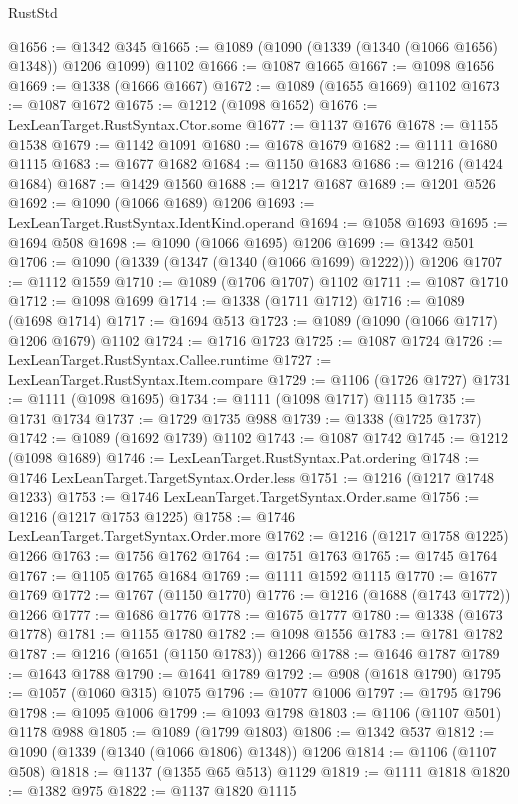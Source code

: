 \begin{lexlean}{RustStd}
\begin{coremodule}
@1656 := @1342 @345
@1665 := @1089 (@1090 (@1339 (@1340 (@1066 @1656) @1348)) @1206 @1099) @1102
@1666 := @1087 @1665
@1667 := @1098 @1656
@1669 := @1338 (@1666 @1667)
@1672 := @1089 (@1655 @1669) @1102
@1673 := @1087 @1672
@1675 := @1212 (@1098 @1652)
@1676 := LexLeanTarget.RustSyntax.Ctor.some
@1677 := @1137 @1676
@1678 := @1155 @1538
@1679 := @1142 @1091
@1680 := @1678 @1679
@1682 := @1111 @1680 @1115
@1683 := @1677 @1682
@1684 := @1150 @1683
@1686 := @1216 (@1424 @1684)
@1687 := @1429 @1560
@1688 := @1217 @1687
@1689 := @1201 @526
@1692 := @1090 (@1066 @1689) @1206
@1693 := LexLeanTarget.RustSyntax.IdentKind.operand
@1694 := @1058 @1693
@1695 := @1694 @508
@1698 := @1090 (@1066 @1695) @1206
@1699 := @1342 @501
@1706 := @1090 (@1339 (@1347 (@1340 (@1066 @1699) @1222))) @1206
@1707 := @1112 @1559
@1710 := @1089 (@1706 @1707) @1102
@1711 := @1087 @1710
@1712 := @1098 @1699
@1714 := @1338 (@1711 @1712)
@1716 := @1089 (@1698 @1714)
@1717 := @1694 @513
@1723 := @1089 (@1090 (@1066 @1717) @1206 @1679) @1102
@1724 := @1716 @1723
@1725 := @1087 @1724
@1726 := LexLeanTarget.RustSyntax.Callee.runtime
@1727 := LexLeanTarget.RustSyntax.Item.compare
@1729 := @1106 (@1726 @1727)
@1731 := @1111 (@1098 @1695)
@1734 := @1111 (@1098 @1717) @1115
@1735 := @1731 @1734
@1737 := @1729 @1735 @988
@1739 := @1338 (@1725 @1737)
@1742 := @1089 (@1692 @1739) @1102
@1743 := @1087 @1742
@1745 := @1212 (@1098 @1689)
@1746 := LexLeanTarget.RustSyntax.Pat.ordering
@1748 := @1746 LexLeanTarget.TargetSyntax.Order.less
@1751 := @1216 (@1217 @1748 @1233)
@1753 := @1746 LexLeanTarget.TargetSyntax.Order.same
@1756 := @1216 (@1217 @1753 @1225)
@1758 := @1746 LexLeanTarget.TargetSyntax.Order.more
@1762 := @1216 (@1217 @1758 @1225) @1266
@1763 := @1756 @1762
@1764 := @1751 @1763
@1765 := @1745 @1764
@1767 := @1105 @1765 @1684
@1769 := @1111 @1592 @1115
@1770 := @1677 @1769
@1772 := @1767 (@1150 @1770)
@1776 := @1216 (@1688 (@1743 @1772)) @1266
@1777 := @1686 @1776
@1778 := @1675 @1777
@1780 := @1338 (@1673 @1778)
@1781 := @1155 @1780
@1782 := @1098 @1556
@1783 := @1781 @1782
@1787 := @1216 (@1651 (@1150 @1783)) @1266
@1788 := @1646 @1787
@1789 := @1643 @1788
@1790 := @1641 @1789
@1792 := @908 (@1618 @1790)
@1795 := @1057 (@1060 @315) @1075
@1796 := @1077 @1006
@1797 := @1795 @1796
@1798 := @1095 @1006
@1799 := @1093 @1798
@1803 := @1106 (@1107 @501) @1178 @988
@1805 := @1089 (@1799 @1803)
@1806 := @1342 @537
@1812 := @1090 (@1339 (@1340 (@1066 @1806) @1348)) @1206
@1814 := @1106 (@1107 @508)
@1818 := @1137 (@1355 @65 @513) @1129
@1819 := @1111 @1818
@1820 := @1382 @975
@1822 := @1137 @1820 @1115

\end{coremodule}
\end{lexlean}
